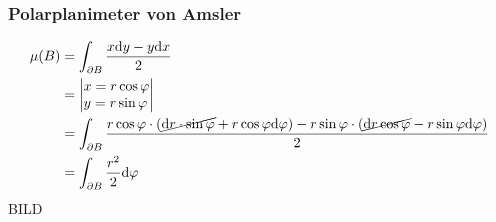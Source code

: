 \subsubsection{Polarplanimeter von Amsler}
\begin{gather*}
	\begin{split}
		\mu(B)
			&= \int_{\partial B} \frac{x \dd y - y \dd x}{2} \\
			&= \begin{vmatrix*}[l] x = r \cos \phi \\ y = r \sin \phi \end{vmatrix*} \\
			&= \int_{\partial B} \frac{r \cos \phi \cdot ( \cancel{\dd r \cdot \sin \phi} + r \cos \phi \dd \phi ) - r \sin \phi \cdot ( \cancel{\dd r \cos \phi} - r \sin \phi \dd \phi )}{2} \\
			&= \int_{\partial B} \frac{r^2}{2} \dd \phi
	\end{split}
\end{gather*}
BILD 
